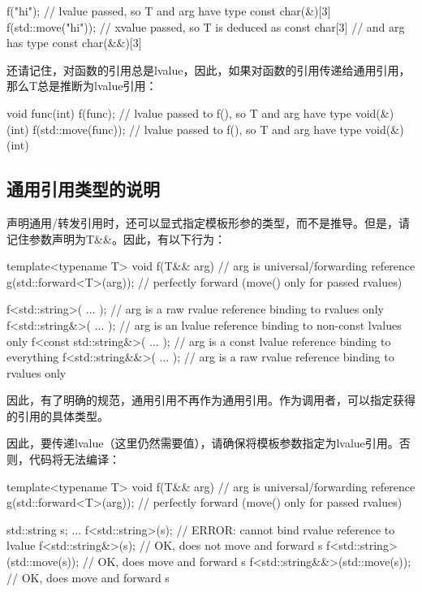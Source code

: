 \begin{cppcode}
f("hi"); // lvalue passed, so T and arg have type const char(&)[3]
f(std::move("hi")); // xvalue passed, so T is deduced as const char[3]
// and arg has type const char(&&)[3]
\end{cppcode}

还请记住，对函数的引用总是lvalue，因此，如果对函数的引用传递给通用引用，那么T总是推断为lvalue引用：

\begin{cppcode}
void func(int) {
}
f(func); // lvalue passed to f(), so T and arg have type void(&)(int)
f(std::move(func)); // lvalue passed to f(), so T and arg have type void(&)(int)
\end{cppcode}

\subsection{通用引用类型的说明}

声明通用/转发引用时，还可以显式指定模板形参的类型，而不是推导。但是，请记住参数声明为T\&\&。因此，有以下行为：

\begin{cppcode}
template<typename T>
void f(T&& arg) // arg is universal/forwarding reference
{
	g(std::forward<T>(arg)); // perfectly forward (move() only for passed rvalues)
}

f<std::string>( ... ); // arg is a raw rvalue reference binding to rvalues only
f<std::string&>( ... ); // arg is an lvalue reference binding to non-const lvalues only
f<const std::string&>( ... ); // arg is a const lvalue reference binding to everything
f<std::string&&>( ... ); // arg is a raw rvalue reference binding to rvalues only
\end{cppcode}

因此，有了明确的规范，通用引用不再作为通用引用。作为调用者，可以指定获得的引用的具体类型。

因此，要传递lvalue（这里仍然需要值），请确保将模板参数指定为lvalue引用。否则，代码将无法编译：

\begin{cppcode}
template<typename T>
void f(T&& arg) // arg is universal/forwarding reference
{
	g(std::forward<T>(arg)); // perfectly forward (move() only for passed rvalues)
}

std::string s;
...
f<std::string>(s); // ERROR: cannot bind rvalue reference to lvalue
f<std::string&>(s); // OK, does not move and forward s
f<std::string>(std::move(s)); // OK, does move and forward s
f<std::string&&>(std::move(s)); // OK, does move and forward s
\end{cppcode}

